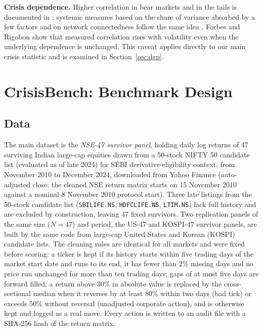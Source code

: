 \documentclass[journal]{IEEEtran}
\begin{document}
\textbf{Crisis dependence.} Higher correlation in bear markets and in the tails is documented in
\cite{longin2001extreme,ang2002asymmetric}; systemic measures based on the share of variance absorbed by a few
factors and on network connectedness follow the same idea \cite{kritzman2011absorption,diebold2014network}.
Forbes and Rigobon \cite{forbes2002contagion} show that measured correlation rises with volatility even when
the underlying dependence is unchanged. This caveat applies directly to our main crisis statistic and is
examined in Section~\ref{sec:dgp}.

\section{CrisisBench: Benchmark Design}
\label{sec:bench}
\subsection{Data}
The main dataset is the \emph{NSE-47 survivor panel}, holding daily log returns of 47 surviving Indian large-cap
equities drawn from a 50-stock NIFTY 50 candidate list (evaluated as of late 2024) for SEBI derivative-eligibility
context, from November 2010 to December 2024, downloaded from Yahoo Finance (auto-adjusted close; the cleaned NSE
return matrix starts on 15 November 2010 against a nominal 8 November 2010 protocol start). Three late listings
from the 50-stock candidate list (\texttt{SBILIFE.NS}, \texttt{HDFCLIFE.NS}, \texttt{LTIM.NS}) lack full history
and are excluded by construction, leaving 47 fixed survivors. Two replication panels of the same size ($N=47$) and
period, the US-47 and KOSPI-47 survivor panels, are built by the same code from large-cap United States and
Korean (KOSPI) candidate lists. The cleaning rules are identical for all markets and were fixed before scoring:
a ticker is kept if its history starts within five trading days of the market start date and runs to its end,
it has fewer than 2\% missing days and no price run unchanged for more than ten trading days; gaps of at most
five days are forward filled; a return above 30\% in absolute value is replaced by the cross-sectional median
when it reverses by at least 80\% within two days (bad tick) or exceeds 50\% without reversal (unadjusted
corporate action), and is otherwise kept and logged as a real move. Every action is written to an audit file
with a SHA-256 hash of the return matrix.
\end{document}
